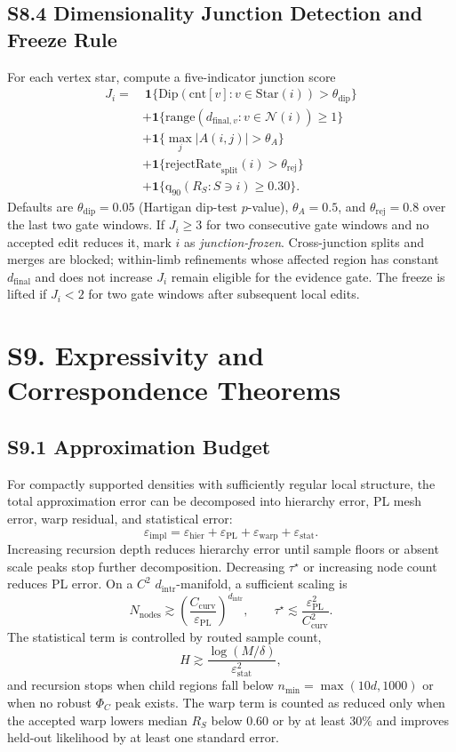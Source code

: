 \documentclass[11pt]{article}
\begin{document}
\subsection*{S8.4 Dimensionality Junction Detection and Freeze Rule}
\label{sec:si-junction-freeze}
For each vertex star, compute a five-indicator junction score
\[
\begin{aligned}
J_i
=&\ \mathbf 1\{\mathrm{Dip}(\mathrm{cnt}[v]:v\in\mathrm{Star}(i))>\theta_{\mathrm{dip}}\}\\
&+\mathbf 1\{\mathrm{range}(d_{\mathrm{final},v}:v\in\mathcal N(i))\ge1\}\\
&+\mathbf 1\{\max_j|A(i,j)|>\theta_A\}\\
&+\mathbf 1\{\mathrm{rejectRate}_{\mathrm{split}}(i)>\theta_{\mathrm{rej}}\}\\
&+\mathbf 1\{\mathrm q_{90}(R_S:S\ni i)\ge0.30\}.
\end{aligned}
\label{eq:si-junction-score}
\]
Defaults are $\theta_{\mathrm{dip}}=0.05$ (Hartigan dip-test $p$-value), $\theta_A=0.5$, and $\theta_{\mathrm{rej}}=0.8$ over the last two gate windows. If $J_i\ge3$ for two consecutive gate windows and no accepted edit reduces it, mark $i$ as \emph{junction-frozen}. Cross-junction splits and merges are blocked; within-limb refinements whose affected region has constant $d_{\mathrm{final}}$ and does not increase $J_i$ remain eligible for the evidence gate. The freeze is lifted if $J_i<2$ for two gate windows after subsequent local edits.

\section*{S9. Expressivity and Correspondence Theorems}

\subsection*{S9.1 Approximation Budget}
For compactly supported densities with sufficiently regular local structure, the total approximation error can be decomposed into hierarchy error, PL mesh error, warp residual, and statistical error:
\[
\varepsilon_{\mathrm{impl}}
=\varepsilon_{\mathrm{hier}}+\varepsilon_{\mathrm{PL}}+\varepsilon_{\mathrm{warp}}+\varepsilon_{\mathrm{stat}}.
\]
Increasing recursion depth reduces hierarchy error until sample floors or absent scale peaks stop further decomposition. Decreasing $\tau^\star$ or increasing node count reduces PL error. On a $C^2$ $d_{\mathrm{intr}}$-manifold, a sufficient scaling is
\[
N_{\mathrm{nodes}}
\gtrsim
\left(\frac{C_{\mathrm{curv}}}{\varepsilon_{\mathrm{PL}}}\right)^{d_{\mathrm{intr}}},
\qquad
\tau^\star
\lesssim
\frac{\varepsilon_{\mathrm{PL}}^2}{C_{\mathrm{curv}}^2}.
\]
The statistical term is controlled by routed sample count,
\[
H
\gtrsim
\frac{\log(M/\delta)}{\varepsilon_{\mathrm{stat}}^2},
\]
and recursion stops when child regions fall below $n_{\min}=\max(10d,1000)$ or when no robust $\Phi_C$ peak exists. The warp term is counted as reduced only when the accepted warp lowers median $R_S$ below $0.60$ or by at least $30\%$ and improves held-out likelihood by at least one standard error.
\end{document}

